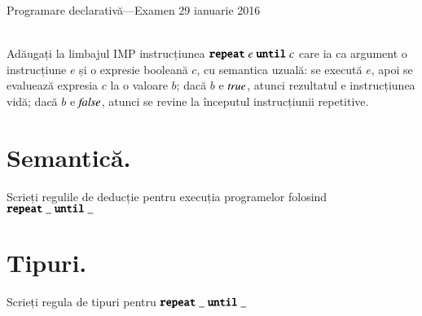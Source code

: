 \documentclass[addpoints,12pt,a4paper,answers]{exam}
\newcommand{\getHeight}[1]{%
}
\newenvironment{solutie}{\par\hspace*{-9em}\begin{minipage}{.98\paperwidth}
\hrulefill {\bf Rezolvare} \hrulefill}{\hrulefill\end{minipage}}
\begin{document}
\begin{center}


Programare declarativă---Examen \hfill  29 ianuarie 2016 \\ \ \\

\end{center}


\begin{questions}
Adăugați la limbajul IMP instrucțiunea $\mathrel{\textbf{\ttfamily repeat}} e \mathrel{\textbf{\ttfamily until}} c$ care ia ca argument o instrucțiune $e$ și o expresie booleană $c$, cu semantica uzuală: se execută $e$, apoi se evaluează expresia $c$ la o valoare $b$; dacă  $b$ e ${\it true}$, atunci rezultatul e instrucțiunea vidă; dacă $b$ e ${\it false}$, atunci se revine la începutul instrucțiunii repetitive.
\begin{parts}
\part[\half] {\bf Semantică. } Scrieți regulile de deducție pentru execuția programelor folosind $\mathrel{\textbf{\ttfamily repeat}}\_\mathrel{\textbf{\ttfamily until}}\_$ 
\getHeight{
\begin{solutie}
(0,25p/regulă)

\[
\reg[SwitchS]{
\Ss
{\c{\terminal{switch}(e)\{\terminal{case} v_1: e_1; \terminal{case} v_2: e_2; \terminal{default:} d\},s}}
{\c{\terminal{switch}(e')\{\terminal{case} v_1: e_1; \terminal{case} v_2: e_2; \terminal{default:} d\},s'}}
}{
\Ss
{\c{e,s}}
{\c{e',s'}}
}{}
\]
\[
\reg[Switch1]{
\Ss
{\c{\terminal{switch}(v)\{\terminal{case} v_1: e_1; \terminal{case} v_2: e_2; \terminal{default:} d\},s}}
{\c{e_1,s}}}{}{v=v_1}
\]
\[
\reg[Switch2]{
\Ss
{\c{\terminal{switch}(v)\{\terminal{case} v_1: e_1; \terminal{case} v_2: e_2; \terminal{default:} d\},s}}
{\c{e_2,s}}}{}{v\neq v_1, v = v_2}
\]
\[
\reg[Switch3]{
\Ss
{\c{\terminal{switch}(v)\{\terminal{case} v_1: e_1; \terminal{case} v_2: e_2; \terminal{default:} d\},s}}
{\c{d,s}}}{}{v\neq v_1, v \neq v_2}
\]
\end{solutie}
}
\part[\half] {\bf Tipuri. } Scrieți regula de tipuri pentru $\mathrel{\textbf{\ttfamily repeat}}\_\mathrel{\textbf{\ttfamily until}}\_$
\getHeight{
\begin{solutie}
(0,2p/câte au tipul la fel ca e sau câte au tipul la fel ca rezultatul)


\end{solutie}}
\end{parts}
\end{questions}
\end{document}
